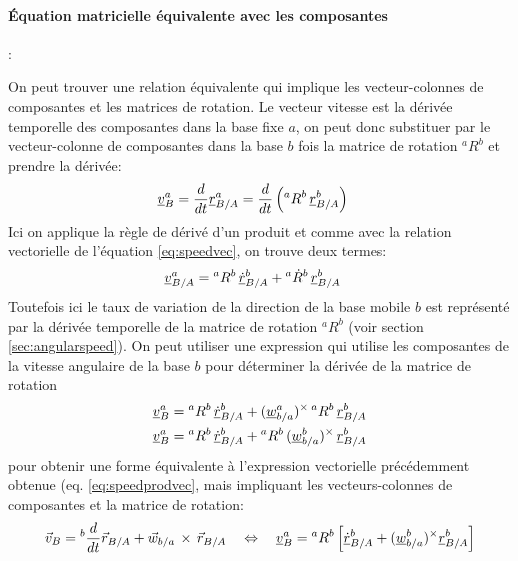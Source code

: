\paragraph{Équation matricielle équivalente avec les composantes}:

On peut trouver une relation équivalente qui implique les vecteur-colonnes de composantes et les matrices de rotation. Le vecteur vitesse est la dérivée temporelle des composantes dans la base fixe $a$, on peut donc substituer par le vecteur-colonne de composantes dans la base $b$ fois la matrice de rotation ${}^{a}R^b$ et prendre la dérivée:
\begin{align}
\underline{v}_{B}^a &= \frac{d}{dt} \underline{r}_{B/A}^a = 
\frac{d}{dt} \left( {}^{a}R^b \, \underline{r}_{B/A}^b \right) 
\end{align}
Ici on applique la règle de dérivé d'un produit et comme avec la relation vectorielle de l'équation \eqref{eq:speedvec}, on trouve deux termes:
\begin{align}
\underline{v}_{B/A}^a &=
{}^{a}R^b \, \underline{\dot{r}}_{B/A}^b + {}^{a}\dot{R}^b \, \underline{r}_{B/A}^b 
\end{align}
Toutefois ici le taux de variation de la direction de la base mobile $b$ est représenté par la dérivée temporelle de la matrice de rotation ${}^{a}R^b$ (voir section \ref{sec:angularspeed}). On peut utiliser une expression qui utilise les composantes de la vitesse angulaire de la base $b$ pour déterminer la dérivée de la matrice de rotation
\begin{align}
\underline{v}_{B}^a &=
{}^{a}R^b \, \underline{\dot{r}}_{B/A}^b + (\underline{w}_{b/a}^a)^{\times} \, {}^{a}R^b \, \underline{r}_{B/A}^b \\
\underline{v}_{B}^a &=
{}^{a}R^b \, \underline{\dot{r}}_{B/A}^b +  {}^{a}R^b \, (\underline{w}_{b/a}^b)^{\times} \, \underline{r}_{B/A}^b
\end{align}
pour obtenir une forme équivalente à l'expression vectorielle précédemment obtenue (eq. \eqref{eq:speedprodvec}, mais impliquant les vecteurs-colonnes de composantes et la matrice de rotation:
\begin{align}
\vec{v}_{B} = {}^{b}\frac{d}{dt} \vec{r}_{B/A} +  \vec{w}_{b/a} \, \times \, \vec{r}_{B/A}
\quad \Leftrightarrow \quad 
\underline{v}_{B}^{a} = {}^{a}R^b \left[ \underline{\dot{r}}^b_{B/A} +  (\underline{w}_{b/a}^b)^{\times} \underline{r}^b_{B/A}  \right] 
\end{align}



